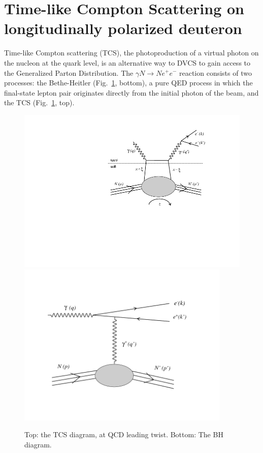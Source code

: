 \documentclass[a4paper,12pt]{report}
\begin{document}
\section{Time-like Compton Scattering on longitudinally polarized deuteron}
Time-like Compton scattering (TCS), the photoproduction of a virtual photon on the nucleon at the quark level, is an alternative way to DVCS to gain access to the Generalized Parton Distribution. 
The $\gamma N \to Ne^+e^-$ reaction consists of two processes: the Bethe-Heitler (Fig.~\ref{tcs_diagram}, bottom), a pure QED process in which the final-state lepton pair originates directly from the initial photon of the beam, and the TCS (Fig.~\ref{tcs_diagram}, top). 
\begin{figure}[htbp] 
   \centering
   \includegraphics[width=6in]{TCS_handbag_bold_bis.png} 
   \includegraphics[width=4in]{BH_diag_TCS.png} 
   \caption{Top: the TCS diagram, at QCD leading twist. Bottom: The BH diagram.}
   \label{tcs_diagram}
\end{figure}
\end{document}
